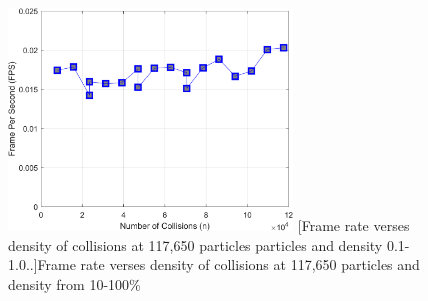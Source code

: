 \begin{figure}[h]
\centering
\includegraphics[width=2.97in]{../plots/Perf_RCPCD_Density0011.png}
[Frame rate verses density of collisions at 117,650 particles particles and density 0.1-1.0..]{Frame rate verses density of collisions at 117,650 particles and density from 10-100\%}
\label{fig:Perf_RCPCD_Density001}
\end{figure}
